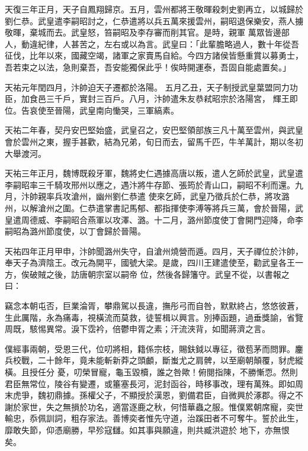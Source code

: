 \begin{pinyinscope}
 天復三年正月，天子自鳳翔歸京。五月，雲州都將王敬暉殺刺史劉再立，以城歸於劉仁恭。武皇遣李嗣昭討之，仁恭遣將以兵五萬來援雲州，嗣昭退保樂安，燕人擄敬暉，棄城而去。武皇怒，笞嗣昭及李存審而削其官。是時，親軍
 萬眾皆邊部人，動違紀律，人甚苦之，左右或以為言。武皇曰：「此輩膽略過人，數十年從吾征伐，比年以來，國藏空竭，諸軍之家賣馬自給。今四方諸侯皆懸重賞以募勇士，吾若束之以法，急則棄吾，吾安能獨保此乎！俟時開運泰，吾固自能處置矣。」


天祐元年閏四月，汴帥迫天子遷都於洛陽。
 五月乙丑，天子制授武皇葉盟同力功臣，加食邑三千戶，實封三百戶。八月，汴帥遣朱友恭弒昭宗於洛陽宮，
 輝王即位。告哀使至晉陽，武皇南向慟哭，三軍縞素。



 天祐二年春，契丹安巴堅始盛，武皇召之，安巴堅領部族三凡十萬至雲州，與武皇會於雲州之東，握手甚歡，結為兄弟，旬日而去，留馬千匹，牛羊萬計，期以冬初大舉渡河。



 天祐三年正月，魏博既殺牙軍，魏將史仁遇據高唐以叛，遣人乞師於武皇，武皇遣李嗣昭率三千騎攻邢州以應之，遇汴將牛存節、張筠於青山口，嗣昭不利而還。九月，汴帥親率兵攻滄州，幽州劉仁恭遣
 使來乞師，武皇乃徵兵於仁恭，將攻潞州，以解滄州之圍。仁恭遣掌書記馬郁、都指揮使李溥等將兵三萬，會於晉陽，武皇遣周德威、李嗣昭合燕軍以攻澤、潞。十二月，潞州節度使丁會開門迎降，命李嗣昭為潞州節度使，以丁會歸於晉陽。



 天祐四年正月甲申，汴帥聞潞州失守，自滄州燒營而遁。四月，天子禪位於汴帥，奉天子為濟陰王。改元為開平，國號大梁。是歲，四川王建遣使至，勸武皇各王一方，俟破賊之後，訪唐朝宗室以嗣帝
 位，然後各歸籓守。武皇不從，以書報之曰：



 竊念本朝屯否，巨業淪胥，攀鼎駕以長違，撫彤弓而自咎，默默終占，悠悠彼蒼，生此厲階，永為痛毒，視橫流而莫救，徒誓楫以興言。別捧函題，過垂獎諭，省覽周既，駭惕異常。淚下霑衿，倍鬱申胥之素；汗流浹背，如聞蔣濟之言。



 僕經事兩朝，受恩三代，位叨將相，籍係宗枝，賜鈇鉞以專征，徵苞茅而問罪。鏖兵校戰，二十餘年，竟未能斬新莽之頭顱，斷蚩尤之肩髀，以至廟朝顛覆，豺虎縱橫。且授任分
 憂，叨榮冒寵，龜玉毀櫝，誰之咎歟！俯閱指陳，不勝慚恧。然則君臣無常位，陵谷有變遷，或箠塞長河，泥封函谷，時移事改，理有萬殊。即如周末虎爭，魏初鼎據。孫權父子，不顯授於漢恩，劉備君臣，自微興於涿郡。得之不謝於家世，失之無損於功名，適當逐鹿之秋，何惜華蟲之服。惟僕累朝席寵，奕世輸忠，忝佩訓詞，粗存家法。善博奕者惟先守道，治蹊田者不可奪牛。誓於此生，靡敢失節，仰憑廟勝，早殄寇讎。如其事與願違，則共臧洪遊於
 地下，亦無恨矣。




\end{pinyinscope}
